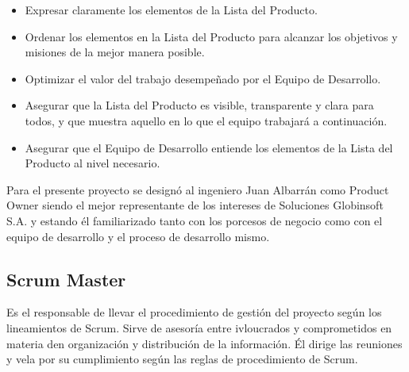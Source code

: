         \begin{itemize}
            \item Expresar claramente los elementos de la Lista del Producto.
            \item Ordenar los elementos en la Lista del Producto para alcanzar los objetivos y misiones de la mejor manera posible.
            \item Optimizar el valor del trabajo desempeñado por el Equipo de Desarrollo.
            \item Asegurar que la Lista del Producto es visible, transparente y clara para todos, y que muestra aquello en lo que el equipo trabajará a continuación.
            \item Asegurar que el Equipo de Desarrollo entiende los elementos de la Lista del Producto al nivel necesario.
        \end{itemize}
               
        Para el presente proyecto se designó al ingeniero Juan Albarrán como Product Owner siendo el mejor representante de los intereses de Soluciones Globinsoft S.A. y estando él familiarizado tanto con los porcesos de negocio como con el equipo de desarrollo y el proceso de desarrollo mismo.
        
        \subsection{Scrum Master}
        \label{scrum-master}
        
        Es el responsable de llevar el procedimiento de gestión del proyecto según los lineamientos de Scrum. Sirve de asesoría entre ivloucrados y comprometidos en materia den organización y distribución de la información. Él dirige las reuniones y vela por su cumplimiento según las reglas de procedimiento de Scrum.
        
